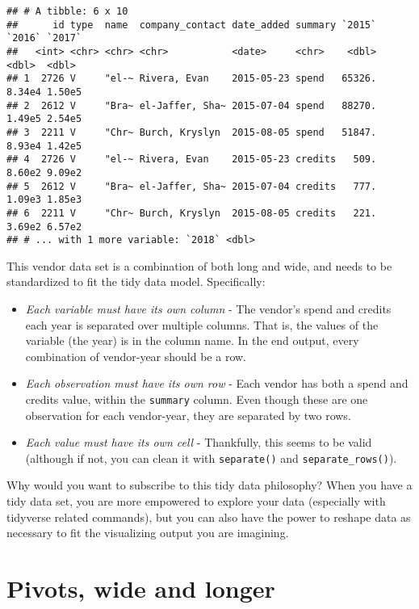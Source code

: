 \documentclass[
]{book}
\providecommand{\tightlist}{%
  \setlength{\itemsep}{0pt}\setlength{\parskip}{0pt}}
\begin{document}
\begin{verbatim}
## # A tibble: 6 x 10
##      id type  name  company_contact date_added summary `2015` `2016` `2017`
##   <int> <chr> <chr> <chr>           <date>     <chr>    <dbl>  <dbl>  <dbl>
## 1  2726 V     "el-~ Rivera, Evan    2015-05-23 spend   65326. 8.34e4 1.50e5
## 2  2612 V     "Bra~ el-Jaffer, Sha~ 2015-07-04 spend   88270. 1.49e5 2.54e5
## 3  2211 V     "Chr~ Burch, Kryslyn  2015-08-05 spend   51847. 8.93e4 1.42e5
## 4  2726 V     "el-~ Rivera, Evan    2015-05-23 credits   509. 8.60e2 9.09e2
## 5  2612 V     "Bra~ el-Jaffer, Sha~ 2015-07-04 credits   777. 1.09e3 1.85e3
## 6  2211 V     "Chr~ Burch, Kryslyn  2015-08-05 credits   221. 3.69e2 6.57e2
## # ... with 1 more variable: `2018` <dbl>
\end{verbatim}

This vendor data set is a combination of both long and wide, and needs to be standardized to fit the tidy data model. Specifically:

\begin{itemize}
\tightlist
\item
  \emph{Each variable must have its own column} - The vendor's spend and credits each year is separated over multiple columns. That is, the values of the variable (the year) is in the column name. In the end output, every combination of vendor-year should be a row.
\item
  \emph{Each observation must have its own row} - Each vendor has both a spend and credits value, within the \texttt{summary} column. Even though these are one observation for each vendor-year, they are separated by two rows.
\item
  \emph{Each value must have its own cell} - Thankfully, this seems to be valid (although if not, you can clean it with \texttt{separate()} and \texttt{separate\_rows()}).
\end{itemize}

Why would you want to subscribe to this tidy data philosophy? When you have a tidy data set, you are more empowered to explore your data (especially with tidyverse related commands), but you can also have the power to reshape data as necessary to fit the visualizing output you are imagining.

\hypertarget{clean-pivot}{%
\section{Pivots, wide and longer}\label{clean-pivot}}
\end{document}
